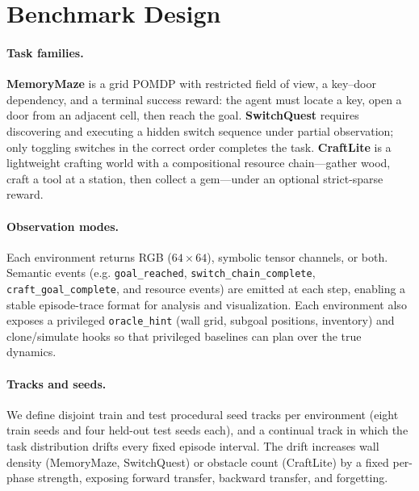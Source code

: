 \documentclass[11pt]{article}
\begin{document}
\section{Benchmark Design}
\paragraph{Task families.}
\textbf{MemoryMaze} is a grid POMDP with restricted field of view, a key--door dependency, and a terminal success reward: the agent must locate a key, open a door from an adjacent cell, then reach the goal. \textbf{SwitchQuest} requires discovering and executing a hidden switch sequence under partial observation; only toggling switches in the correct order completes the task. \textbf{CraftLite} is a lightweight crafting world with a compositional resource chain---gather wood, craft a tool at a station, then collect a gem---under an optional strict-sparse reward.

\paragraph{Observation modes.}
Each environment returns RGB ($64\times64$), symbolic tensor channels, or both. Semantic events (e.g. \texttt{goal\_reached}, \texttt{switch\_chain\_complete}, \texttt{craft\_goal\_complete}, and resource events) are emitted at each step, enabling a stable episode-trace format for analysis and visualization. Each environment also exposes a privileged \texttt{oracle\_hint} (wall grid, subgoal positions, inventory) and clone/simulate hooks so that privileged baselines can plan over the true dynamics.

\paragraph{Tracks and seeds.}
We define disjoint train and test procedural seed tracks per environment (eight train seeds and four held-out test seeds each), and a continual track in which the task distribution drifts every fixed episode interval. The drift increases wall density (MemoryMaze, SwitchQuest) or obstacle count (CraftLite) by a fixed per-phase strength, exposing forward transfer, backward transfer, and forgetting.
\end{document}
